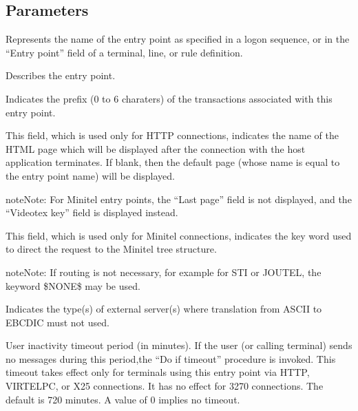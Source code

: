\documentclass[letterpaper,10pt,english]{sphinxmanual}
\begin{document}
\subsection{Parameters}
\label{\detokenize{connectivity_guide:index-109}}\label{\detokenize{connectivity_guide:id59}}\begin{description}
\sphinxAtStartPar
Represents the name of the entry point as specified in a logon sequence, or in the “Entry point” field of a terminal, line, or rule definition.

\sphinxAtStartPar
Describes the entry point.

\sphinxAtStartPar
Indicates the prefix (0 to 6 charaters) of the transactions associated with this entry point.

\sphinxAtStartPar
This field, which is used only for HTTP connections, indicates the name of the HTML page which will be displayed after the connection with the host application terminates. If blank, then the default page (whose name is equal to the entry point name) will be displayed.

\begin{sphinxadmonition}{note}{Note:}
\sphinxAtStartPar
For Minitel entry points, the “Last page” field is not displayed, and the “Videotex key” field is displayed instead.
\end{sphinxadmonition}

\sphinxAtStartPar
This field, which is used only for Minitel connections, indicates the key word used to direct the request to the Minitel tree structure.

\begin{sphinxadmonition}{note}{Note:}
\sphinxAtStartPar
If routing is not necessary, for example for STI or JOUTEL, the keyword \$NONE\$ may be used.
\end{sphinxadmonition}

\sphinxAtStartPar
Indicates the type(s) of external server(s) where translation from ASCII to EBCDIC must not used.

\sphinxAtStartPar
User inactivity timeout period (in minutes). If the user (or calling terminal) sends no messages during this period,the “Do if timeout” procedure is invoked. This timeout takes effect only for terminals using this entry point via HTTP, VIRTELPC, or X25 connections. It has no effect for 3270 connections. The default is 720 minutes. A value of 0 implies no timeout.


\end{description}
\end{document}
